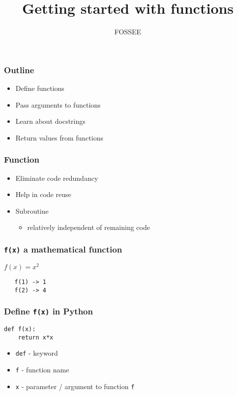 \documentclass[presentation]{beamer}
\title{Getting started with functions}
\author{FOSSEE}
\date{}
\begin{document}
\maketitle









    
    



\begin{frame}
\frametitle{Outline}
\label{sec-1}

\begin{itemize}
\item Define functions
\item Pass arguments to functions
\item Learn about docstrings
\item Return values from functions
\end{itemize}
\end{frame}
\begin{frame}
\frametitle{Function}
\label{sec-2}

\begin{itemize}
\item Eliminate code redundancy
\item Help in code reuse
\item Subroutine

\begin{itemize}
\item relatively independent of remaining code
\end{itemize}

\end{itemize}
\end{frame}
\begin{frame}[fragile]
\frametitle{\texttt{f(x)} a mathematical function}
\label{sec-3}


  $f(x) = x^{2}$

\begin{verbatim}
   f(1) -> 1
   f(2) -> 4
\end{verbatim}
\end{frame}
\begin{frame}[fragile]
\frametitle{Define \texttt{f(x)} in Python}
\label{sec-4}

\begin{verbatim}
def f(x):
    return x*x
\end{verbatim}

\begin{itemize}
\item \texttt{def} - keyword
\item \texttt{f} - function name
\item \texttt{x} - parameter / argument to function \texttt{f}
\end{itemize}
\end{frame}
\end{document}
